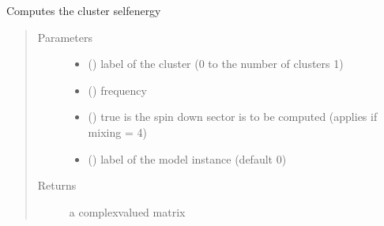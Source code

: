 \documentclass[letterpaper,10pt,english]{sphinxmanual}
\begin{document}
\begin{fulllineitems}
\label{\detokenize{functions:pyqcm.cluster_self_energy}}
\sphinxAtStartPar
Computes the cluster self\sphinxhyphen{}energy
\begin{quote}\begin{description}
\item[{Parameters}] \leavevmode\begin{itemize}
\item {} 
\sphinxAtStartPar
{} () \textendash{} label of the cluster (0 to the number of clusters \sphinxhyphen{}1)

\item {} 
\sphinxAtStartPar
{} () \textendash{} frequency

\item {} 
\sphinxAtStartPar
{} () \textendash{} true is the spin down sector is to be computed (applies if mixing =       4)

\item {} 
\sphinxAtStartPar
{} () \textendash{} label of the model instance (default 0)

\end{itemize}

\item[{Returns}] \leavevmode
\sphinxAtStartPar
a complex\sphinxhyphen{}valued matrix

\end{description}\end{quote}

\end{fulllineitems}

\end{document}
